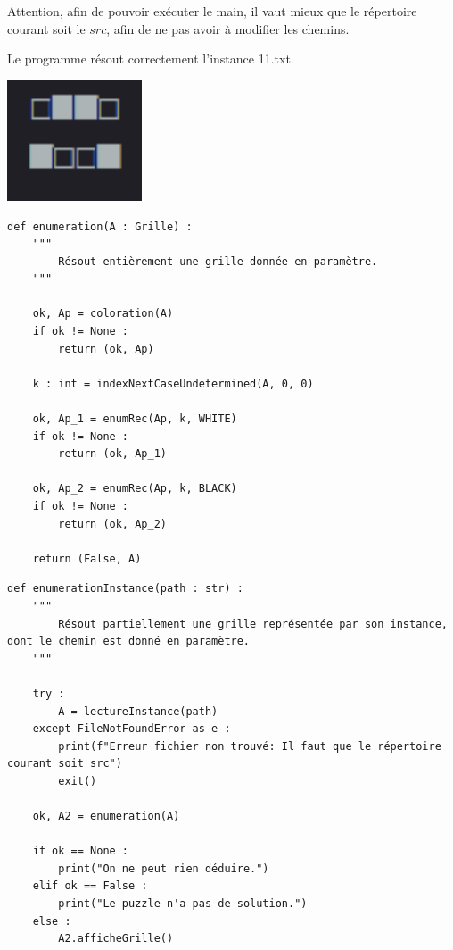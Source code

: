 \documentclass[a4paper,12pt]{article}
\begin{document}
Attention, afin de pouvoir exécuter le main, il vaut mieux que le répertoire courant soit le $src$, afin de ne pas avoir à modifier les chemins.\\

\begin{center}Le programme résout correctement l'instance 11.txt.\end{center}
\begin{center}\includegraphics[width=4cm]{instance11.png}\end{center}

\newpage

\begin{lstlisting}
def enumeration(A : Grille) :
    """
        Résout entièrement une grille donnée en paramètre.
    """
    
    ok, Ap = coloration(A)
    if ok != None :
        return (ok, Ap)
    
    k : int = indexNextCaseUndetermined(A, 0, 0)
    
    ok, Ap_1 = enumRec(Ap, k, WHITE)
    if ok != None :
        return (ok, Ap_1)
    
    ok, Ap_2 = enumRec(Ap, k, BLACK)
    if ok != None :
        return (ok, Ap_2)
    
    return (False, A)
\end{lstlisting}


\begin{lstlisting}
def enumerationInstance(path : str) :
    """
        Résout partiellement une grille représentée par son instance, dont le chemin est donné en paramètre.
    """
    
    try :
        A = lectureInstance(path)
    except FileNotFoundError as e :
        print(f"Erreur fichier non trouvé: Il faut que le répertoire courant soit src")
        exit()
        
    ok, A2 = enumeration(A)
    
    if ok == None :
        print("On ne peut rien déduire.")
    elif ok == False :
        print("Le puzzle n'a pas de solution.")
    else :
        A2.afficheGrille()
\end{lstlisting}
\end{document}
